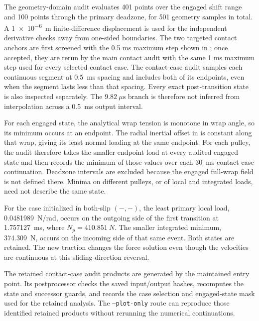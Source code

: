 \documentclass[11pt]{report}
\numberwithin{equation}{section}
\begin{document}
The geometry-domain audit evaluates 401 points over the engaged shift range and
100 points through the primary deadzone, for 501 geometry samples in total. A
\SI{1e-6}{\meter} finite-difference displacement is used for the independent
derivative checks away from one-sided boundaries. The two targeted contact
anchors are first screened with the 0.5 ms maximum step shown in
; once accepted, they are rerun by the main contact
audit with the same 1 ms maximum step used for every selected contact case.
The contact-case audit samples each continuous segment at \SI{0.5}{ms}
spacing and includes both of its endpoints, even when the segment lasts less
than that spacing. Every exact post-transition state is also inspected
separately. The \(9.82~\mu\mathrm{s}\) branch is therefore not inferred from
interpolation across a \SI{0.5}{ms} output interval.

For each engaged state, the analytical wrap tension is monotone in wrap angle,
so its minimum occurs at an endpoint. The radial inertial offset in
 is constant along that wrap, giving its least
normal loading at the same endpoint. For each pulley, the audit therefore takes
the smaller endpoint load at every audited engaged state and then records the
minimum of those values over each \SI{30}{ms} contact-case continuation.
Deadzone intervals are excluded because the engaged full-wrap field is not
defined there. Minima on different pulleys, or of local and integrated loads,
need not describe the same state.

For the case initialized in both-slip $(-,-)$, the least primary local load,
\SI{0.0481989}{N/rad}, occurs on the outgoing side of the first transition at
\SI{1.757127}{ms}, where $N_p=\SI{410.851}{N}$. The smaller integrated
minimum, \SI{374.309}{N}, occurs on the incoming side of that same event.
Both states are retained. The new traction changes the force solution even
though the velocities are continuous at this sliding-direction reversal.

The retained contact-case audit products are generated by the maintained
 entry point. Its
postprocessor checks the saved input/output hashes, recomputes the state and
successor guards, and records the case selection and engaged-state mask used
for the retained analysis. The \texttt{--plot-only} route can reproduce those
identified retained products without rerunning the numerical continuations.
\end{document}
